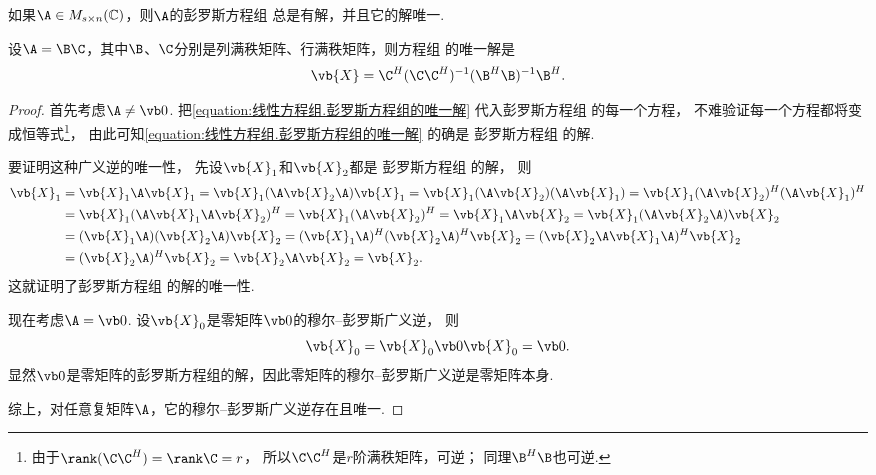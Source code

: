 \begin{theorem}[穆尔--彭罗斯广义逆的唯一性]\label{theorem:线性方程组.穆尔--彭罗斯广义逆的唯一性}
如果\(\A \in M_{s \times n}(\mathbb{C})\)，则\(\A\)的彭罗斯方程组  总是有解，并且它的解唯一.

设\(\A=\B\C\)，其中\(\B\)、\(\C\)分别是列满秩矩阵、行满秩矩阵，则方程组  的唯一解是
\begin{equation}\label{equation:线性方程组.彭罗斯方程组的唯一解}
	\vb{X} = \C^H (\C \C^H)^{-1} (\B^H \B)^{-1} \B^H.
\end{equation}
\begin{proof}
首先考虑\(\A\neq\vb0\).
把\cref{equation:线性方程组.彭罗斯方程组的唯一解}
代入彭罗斯方程组  的每一个方程，
不难验证每一个方程都将变成恒等式\footnote{由于\(\rank(\C\C^H)=\rank\C=r\)，
所以\(\C\C^H\)是\(r\)阶满秩矩阵，可逆；
同理\(\B^H\B\)也可逆.}，
由此可知\cref{equation:线性方程组.彭罗斯方程组的唯一解} 的确是
彭罗斯方程组  的解.

要证明这种广义逆的唯一性，
先设\(\vb{X}_1\)和\(\vb{X}_2\)都是
彭罗斯方程组  的解，
则\begin{align*}
	\vb{X}_1
	&= \vb{X}_1\A\vb{X}_1
	= \vb{X}_1(\A\vb{X}_2\A)\vb{X}_1
	= \vb{X}_1(\A\vb{X}_2)(\A\vb{X}_1)
	= \vb{X}_1(\A\vb{X}_2)^H(\A\vb{X}_1)^H \\
	&= \vb{X}_1(\A\vb{X}_1\A\vb{X}_2)^H
	= \vb{X}_1(\A\vb{X}_2)^H
	= \vb{X}_1\A\vb{X}_2
	= \vb{X}_1(\A\vb{X}_2\A)\vb{X}_2 \\
	&= (\vb{X}_1\A)(\vb{X}_2\A)\vb{X}_2
	= (\vb{X}_1\A)^H(\vb{X}_2\A)^H\vb{X}_2
	= (\vb{X}_2\A\vb{X}_1\A)^H \vb{X}_2 \\
	&= (\vb{X}_2\A)^H \vb{X}_2
	= \vb{X}_2\A\vb{X}_2
	= \vb{X}_2.
\end{align*}
这就证明了彭罗斯方程组  的解的唯一性.

现在考虑\(\A=\vb0\).
设\(\vb{X}_0\)是零矩阵\(\vb0\)的穆尔--彭罗斯广义逆，
则\[
	\vb{X}_0 = \vb{X}_0 \vb0 \vb{X}_0 = \vb0.
\]
显然\(\vb0\)是零矩阵的彭罗斯方程组的解，因此零矩阵的穆尔--彭罗斯广义逆是零矩阵本身.

综上，对任意复矩阵\(\A\)，它的穆尔--彭罗斯广义逆存在且唯一.
\end{proof}
\end{theorem}
